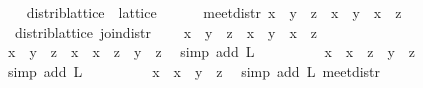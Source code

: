 \begin{isabellebody}
\endisatagproof
{\isafoldproof}%
%
\isadelimproof
\isanewline
%
\endisadelimproof
\isanewline
\ \ \isamarkupfalse%
\ distrib{\isacharunderscore}lattice\ {\isacharequal}\ lattice\ {\isacharplus}\isanewline
\ \ \ \ \ meet{\isacharunderscore}distr{\isacharcolon}\ {\isachardoublequoteopen}x\ {\isasymsqinter}\ {\isacharparenleft}y\ {\isasymsqunion}\ z{\isacharparenright}\ {\isacharequal}\ x\ {\isasymsqinter}\ y\ {\isasymsqunion}\ x\ {\isasymsqinter}\ z{\isachardoublequoteclose}\isanewline
\isanewline
\ \ \isamarkupfalse%
\ {\isacharparenleft}\ distrib{\isacharunderscore}lattice{\isacharparenright}\ join{\isacharunderscore}distr{\isacharcolon}\isanewline
\ \ \ \ {\isachardoublequoteopen}x\ {\isasymsqunion}\ {\isacharparenleft}y\ {\isasymsqinter}\ z{\isacharparenright}\ {\isacharequal}\ {\isacharparenleft}x\ {\isasymsqunion}\ y{\isacharparenright}\ {\isasymsqinter}\ {\isacharparenleft}x\ {\isasymsqunion}\ z{\isacharparenright}{\isachardoublequoteclose}\ \ \isanewline
%
\isadelimproof
\ \ \ \ %
\endisadelimproof
%
\isatagproof
{}\isamarkupfalse%
\ {\isacharminus}\isanewline
\ \ \ \ \isamarkupfalse%
\ {\isachardoublequoteopen}x\ {\isasymsqunion}\ {\isacharparenleft}y\ {\isasymsqinter}\ z{\isacharparenright}\ {\isacharequal}\ {\isacharparenleft}x\ {\isasymsqunion}\ {\isacharparenleft}x\ {\isasymsqinter}\ z{\isacharparenright}{\isacharparenright}\ {\isasymsqunion}\ {\isacharparenleft}y\ {\isasymsqinter}\ z{\isacharparenright}{\isachardoublequoteclose}\ \isamarkupfalse%
\ {\isacharparenleft}simp\ add{\isacharcolon}\ L{}{\isacharparenright}\isanewline
\ \ \ \ \isamarkupfalse%
\ \isamarkupfalse%
\ {\isachardoublequoteopen}{\isachardot}{\isachardot}{\isachardot}\ {\isacharequal}\ x\ {\isasymsqunion}\ {\isacharparenleft}{\isacharparenleft}x\ {\isasymsqinter}\ z{\isacharparenright}\ {\isasymsqunion}\ {\isacharparenleft}y\ {\isasymsqinter}\ z{\isacharparenright}{\isacharparenright}{\isachardoublequoteclose}\ \isamarkupfalse%
\ {\isacharparenleft}simp\ add{\isacharcolon}\ L{}{\isacharparenright}\isanewline
\ \ \ \ \isamarkupfalse%
\ \isamarkupfalse%
\ {\isachardoublequoteopen}{\isachardot}{\isachardot}{\isachardot}\ {\isacharequal}\ x\ {\isasymsqunion}\ {\isacharparenleft}{\isacharparenleft}x\ {\isasymsqunion}\ y{\isacharparenright}\ {\isasymsqinter}\ z{\isacharparenright}{\isachardoublequoteclose}\ \isamarkupfalse%
\ {\isacharparenleft}simp\ add{\isacharcolon}\ L{}\ meet{\isacharunderscore}distr{\isacharparenright}\isanewline

\end{isabellebody}
